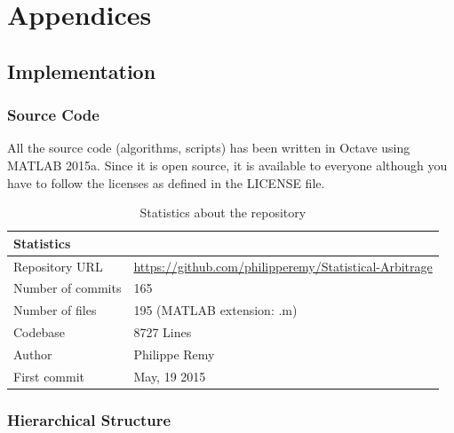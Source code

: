 \documentclass[11pt,a4,twosided,singlespacing,titlepagenumber=on]{scrreprt}
\numberwithin{equation}{chapter} %
\theoremstyle{remark}
\begin{document}
\chapter{Appendices}

\section{Implementation}

\subsection{Source Code}
\label{app:implementation}
All the source code (algorithms, scripts) has been written in Octave using MATLAB 2015a. Since it is open source, it is available to everyone although you have to follow the licenses as defined in the LICENSE file.

\begin{table}[H]
\centering
\begin{tabular}{ll}
\hline
\multicolumn{1}{|l}{Statistics}     & \multicolumn{1}{l|}{} \\ \hline
Repository URL 					   &  \url{https://github.com/philipperemy/Statistical-Arbitrage} \\
Number of commits   			 &  165 \\
Number of files   				 &  195 (MATLAB extension: .m) \\
Codebase   				         &  8727 Lines\\
Author          &  Philippe Remy \\
First commit & May, 19 2015 \\
\hline
\end{tabular}
\caption{Statistics about the repository}
\label{Statistics_repository}
\end{table}

\subsection{Hierarchical Structure}
\end{document}

